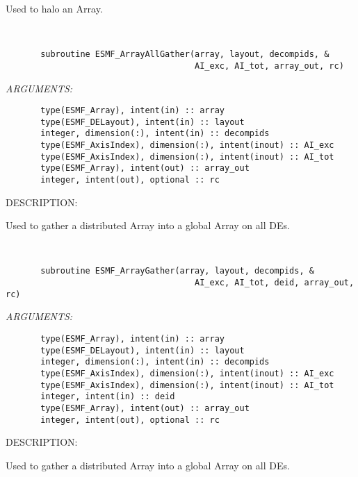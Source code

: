    Used to halo an Array.
  
   
 
\mbox{}\hrulefill\ 
 

\begin{verbatim}       subroutine ESMF_ArrayAllGather(array, layout, decompids, &
                                      AI_exc, AI_tot, array_out, rc)\end{verbatim}{\em ARGUMENTS:}
\begin{verbatim}       type(ESMF_Array), intent(in) :: array
       type(ESMF_DELayout), intent(in) :: layout
       integer, dimension(:), intent(in) :: decompids
       type(ESMF_AxisIndex), dimension(:), intent(inout) :: AI_exc
       type(ESMF_AxisIndex), dimension(:), intent(inout) :: AI_tot
       type(ESMF_Array), intent(out) :: array_out
       integer, intent(out), optional :: rc\end{verbatim}
{\sf DESCRIPTION:\\ }


   Used to gather a distributed Array into a global Array on all DEs.
  
   
 
\mbox{}\hrulefill\ 
 

\begin{verbatim}       subroutine ESMF_ArrayGather(array, layout, decompids, &
                                      AI_exc, AI_tot, deid, array_out, rc)\end{verbatim}{\em ARGUMENTS:}
\begin{verbatim}       type(ESMF_Array), intent(in) :: array
       type(ESMF_DELayout), intent(in) :: layout
       integer, dimension(:), intent(in) :: decompids
       type(ESMF_AxisIndex), dimension(:), intent(inout) :: AI_exc
       type(ESMF_AxisIndex), dimension(:), intent(inout) :: AI_tot
       integer, intent(in) :: deid
       type(ESMF_Array), intent(out) :: array_out
       integer, intent(out), optional :: rc\end{verbatim}
{\sf DESCRIPTION:\\ }


   Used to gather a distributed Array into a global Array on all DEs.
  
   
 
\mbox{}\hrulefill\ 
 

